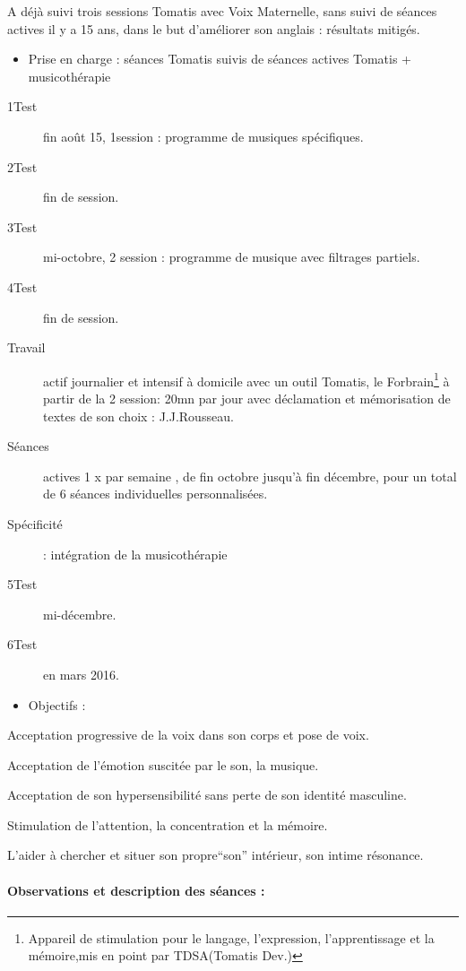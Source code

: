 A déjà suivi trois sessions Tomatis avec Voix Maternelle, sans suivi
de séances actives il y a 15 ans, dans le but d'améliorer son anglais
: résultats mitigés. 
\begin{itemize}
\item Prise en charge : séances Tomatis suivis de séances actives Tomatis
+ musicothérapie
\end{itemize}
\begin{description}
\item [{1\textdegree Test}] fin août 15, 1\textdegree session : programme
de musiques spécifiques.
\item [{2\textdegree Test}] fin de session.
\item [{3\textdegree Test}] mi-octobre, 2\textdegree{} session : programme
de musique avec filtrages partiels.
\item [{4\textdegree Test}] fin de session.
\item [{Travail}] actif journalier et intensif à domicile avec un outil
Tomatis, le Forbrain\footnote{Appareil de stimulation pour le langage, l'expression, l'apprentissage
et la mémoire,mis en point par TDSA(Tomatis Dev.) } à partir de la 2\textdegree{} session: 20mn par jour avec déclamation
et mémorisation de textes de son choix : J.J.Rousseau.
\item [{Séances}] actives 1 x par semaine , de fin octobre jusqu'à fin
décembre, pour un total de 6 séances individuelles personnalisées.
\item [{Spécificité}] : intégration de la musicothérapie
\item [{5\textdegree Test}] mi-décembre.
\item [{6\textdegree Test}] en mars 2016.
\end{description}
\begin{itemize}
\item Objectifs : 
\end{itemize}
Acceptation progressive de la voix dans son corps et pose de voix.

Acceptation de l'émotion suscitée par le son, la musique.

Acceptation de son hypersensibilité sans perte de son identité masculine.

Stimulation de l'attention, la concentration et la mémoire. 

L'aider à chercher et situer son propre``son'' intérieur, son intime
résonance.

\paragraph{Observations et description des séances : }

